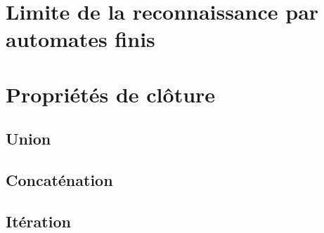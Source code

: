 \section{Limite de la reconnaissance par automates finis}

\section{Propriétés de clôture}
\label{cloture}
\subsection{Union}

\subsection{Concaténation}

\subsection{Itération}





